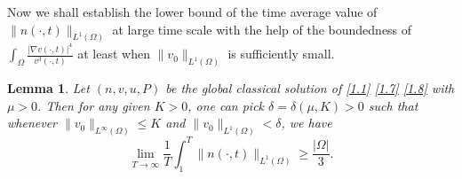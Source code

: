 \documentclass[12pt]{article}
\theoremstyle{plain}
\newtheorem{lemma}{Lemma}[section]
\theoremstyle{definition}
\numberwithin{equation}{section}
\begin{document}
Now we shall establish the lower bound of
the time average value of $\|n(\cdot,t)\|_{L^1(\Omega)}$ at large time scale with the help of the boundedness of $\int_\Omega \frac{|\nabla v(\cdot,t)|^4}{v^3(\cdot,t)}$ at least when $\|v_0\|_{L^1(\Omega)}$ is sufficiently small.
\begin{lemma}\label{lemma4.7}
Let $(n,v,u,P)$ be the global classical solution of \eqref{1.1} \eqref{1.7} \eqref{1.8} with $\mu>0$.
Then for any given $K>0$, one can pick $\delta=\delta(\mu,K)>0$  such that whenever  $\|v_{0}\|_{L^{\infty}(\Omega)}\leq K$ and $\|v_0\|_{L^1(\Omega)}<\delta$, we have
\begin{equation}\label{4.19}
\displaystyle\lim _{ \overline{T\rightarrow \infty}}\frac1T\int^T_1\|n(\cdot,t)\|_{L^1(\Omega)}\geq \frac { |\Omega|} 3.
\end{equation}
\end{lemma}
\end{document}
